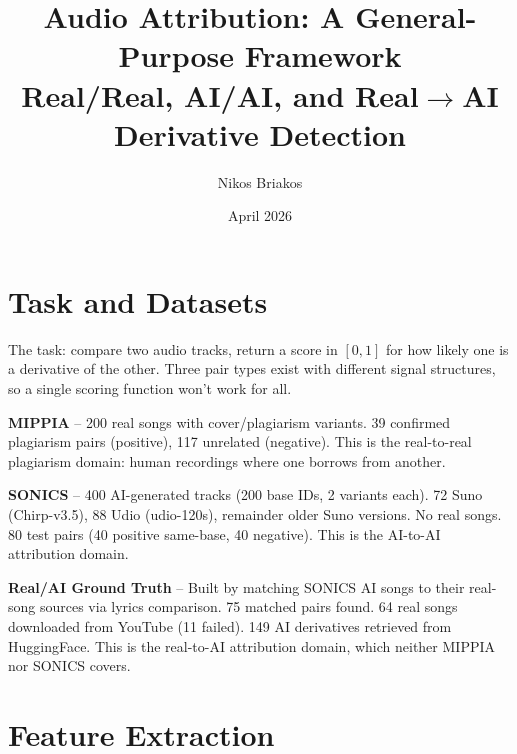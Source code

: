 \documentclass[10pt,a4paper]{article}
\title{\textbf{Audio Attribution: A General-Purpose Framework}\\[0.2em]
  \small Real/Real, AI/AI, and Real$\to$AI Derivative Detection}
\author{Nikos Briakos}
\date{April 2026}
\begin{document}
\maketitle

\noindent{}

\bigskip

\section{Task and Datasets}

The task: compare two audio tracks, return a score in $[0, 1]$ for how likely
one is a derivative of the other. Three pair types exist with different signal
structures, so a single scoring function won't work for all.

\textbf{MIPPIA} -- 200 real songs with cover/plagiarism variants.
39 confirmed plagiarism pairs (positive), 117 unrelated (negative).
This is the real-to-real plagiarism domain: human recordings where one borrows
from another.

\textbf{SONICS} -- 400 AI-generated tracks (200 base IDs, 2 variants each).
72 Suno (Chirp-v3.5), 88 Udio (udio-120s), remainder older Suno versions.
No real songs. 80 test pairs (40 positive same-base, 40 negative).
This is the AI-to-AI attribution domain.

\textbf{Real/AI Ground Truth} -- Built by matching SONICS AI songs to their
real-song sources via lyrics comparison. 75 matched pairs found.
64 real songs downloaded from YouTube (11 failed). 149 AI derivatives
retrieved from HuggingFace. This is the real-to-AI attribution domain,
which neither MIPPIA nor SONICS covers.

\section{Feature Extraction}
\end{document}
